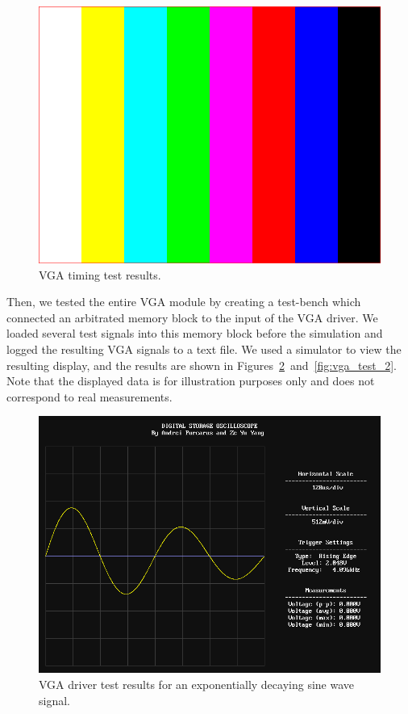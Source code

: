 \documentclass[journal,hidelinks]{IEEEtran}
\begin{document}
\begin{figure}[!htb]
  \centering
  \includegraphics[width=\columnwidth]{test-results/vga_timing.png}
  \caption{VGA timing test results.}
  \label{fig:vga_timing_test}
\end{figure}

Then, we tested the entire VGA module by creating a test-bench which connected an arbitrated memory block to the input of the VGA driver. We loaded several test signals into this memory block before the simulation and logged the resulting VGA signals to a text file. We used a simulator to view the resulting display, and the results are shown in Figures~\ref{fig:vga_test_1}~and~\ref{fig:vga_test_2}. Note that the displayed data is for illustration purposes only and does not correspond to real measurements.

\begin{figure}[!htb]
  \centering
  \includegraphics[width=\columnwidth]{test-results/vga_test_signal1.png}
  \caption{VGA driver test results for an exponentially decaying sine wave signal.}
  \label{fig:vga_test_1}
\end{figure}
\end{document}
